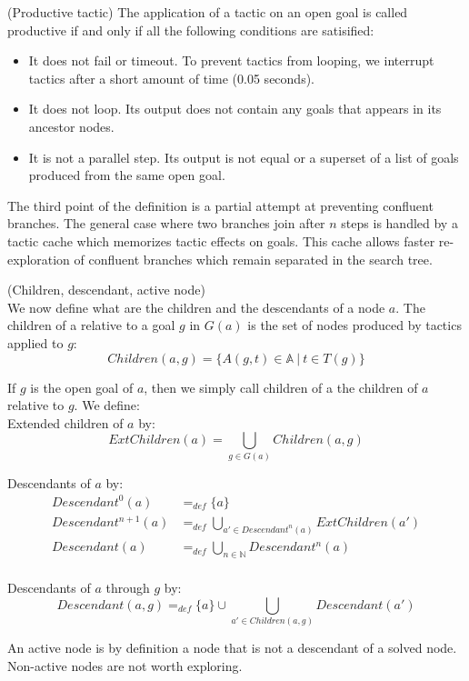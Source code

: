 \documentclass[runningheads,a4paper,draft]{svjour3}
\begin{document}
\begin{definition} (Productive tactic) 
The application of a tactic on an open goal is called productive if and only if 
all the following conditions are satisified:
\begin{itemize}
\item It does not fail or timeout. To prevent tactics from looping, we 
interrupt tactics after a short amount of time (0.05 seconds). 
\item It does not loop. Its output does not contain any goals that appears in 
its ancestor nodes.
\item It is not a parallel step. Its output is not equal or a superset 
of a list of goals produced from the same open goal.
\end{itemize}

The third point of the definition is a partial attempt at preventing confluent 
branches. The general case where two branches join after $n$ steps is handled 
by a tactic cache which memorizes tactic effects on goals. This
cache allows faster re-exploration of confluent branches which remain 
separated in the search tree.
\end{definition}

\begin{definition}\label{def:desc}(Children, descendant, active node)\\
We now define what are the children and the descendants of a node $a$. The 
children of a relative to a goal $g$ in $G(a)$ 
is the set of nodes produced by tactics applied to $g$:
  \[Children(a,g) = \lbrace A(g,t)\in \mathbb{A}\ |\ t \in T(g) \rbrace \]

If $g$ is the open goal of $a$, then we simply call children of a the 
children of $a$ relative to $g$. We define:\\

Extended children of $a$ by:
  \[ExtChildren(a) = \bigcup_{g \in G(a)} Children(a,g) \]

Descendants of $a$ by:
\begin{align*}
Descendant^{0}(a) &=_{def} \lbrace a \rbrace \\ 
Descendant^{n+1}(a) &=_{def} \bigcup_{a' \in Descendant^{n}(a)} 
ExtChildren(a') \\
Descendant(a) &=_{def} \bigcup_{n \in \mathbb{N}} Descendant^n(a)\\
\end{align*}

Descendants of $a$ through $g$ by:
\[Descendant(a,g) =_{def} 
  \lbrace a \rbrace \cup \bigcup_{a' \in Children(a,g)} Descendant(a')\]


An active node is by definition a node that is not a descendant of a 
solved node. Non-active nodes are not worth exploring.

\end{definition}
\end{document}
